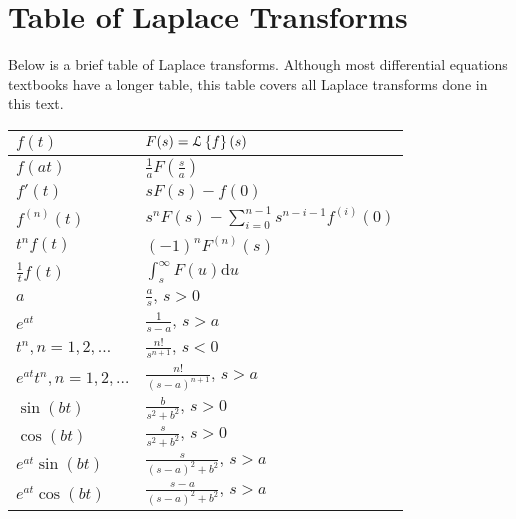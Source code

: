 \section{Table of Laplace Transforms}
\noindent
Below is a brief table of Laplace transforms. Although most differential equations textbooks have a longer table, this table covers all Laplace transforms done in this text.
\renewcommand{\arraystretch}{1.75}
\begin{table}[h]
	\centering
	\begin{tabular}{ l | l }
		$f(t)$  & $F(s) = \mathcal{L}\left\{ f \right\}\left(s\right)$	\\
		\hline
		$f(at)$ & $\frac{1}{a}F\left(\frac{s}{a}\right)$	\\
		$f'(t)$ & $sF(s) - f(0)$	\\
		$f^{(n)}(t)$ & $s^nF(s) - \sum_{i=0}^{n-1}{s^{n-i-1}f^{(i)}}(0)$	\\
		$t^nf(t)$ & $(-1)^nF^{(n)}(s)$	\\
		$\frac{1}{t}f(t)$ & $\int_s^\infty{F(u) \mathrm{d}u}$	\\
		$a$ & $\frac{a}{s}\text{, } s > 0$ \\
		$e^{at}$ & $\frac{1}{s-a}\text{, } s > a$	\\
		$t^n, n = 1,2,\ldots$ & $\frac{n!}{s^{n+1}}\text{, } s < 0$	\\
		$e^{at}t^n, n = 1,2,\ldots$ & $\frac{n!}{(s-a)^{n+1}}\text{, } s > a$	\\
		$\sin{(bt)}$ & $\frac{b}{s^2 + b^2}\text{, } s > 0$ \\
		$\cos{(bt)}$ & $\frac{s}{s^2 + b^2}\text{, } s > 0$ \\
		$e^{at}\sin{(bt)}$ & $\frac{s}{(s-a)^2 + b^2}\text{, } s > a$ \\
		$e^{at}\cos{(bt)}$ & $\frac{s-a}{(s-a)^2 + b^2}\text{, } s > a$ \\
	\end{tabular}
\end{table}